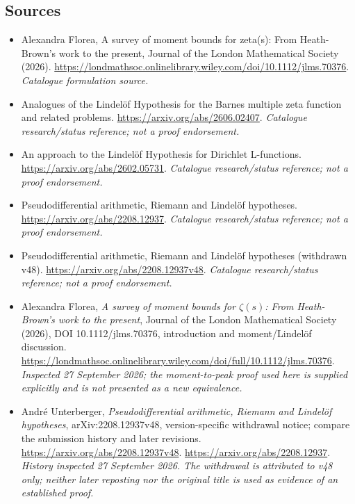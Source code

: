 \documentclass[11pt,a4paper]{article}
\numberwithin{equation}{section}
\begin{document}
\subsection{Sources}
\begin{itemize}\raggedright
\item[\textnormal{[S1]}]\hypertarget{source:81:1}{} Alexandra Florea, A survey of moment bounds for zeta(s): From Heath-Brown's work to the present, Journal of the London Mathematical Society (2026).
\url{https://londmathsoc.onlinelibrary.wiley.com/doi/10.1112/jlms.70376}.
{\small\textit{Catalogue formulation source.}}
\item[\textnormal{[S2]}]\hypertarget{source:81:2}{} Analogues of the Lindelöf Hypothesis for the Barnes multiple zeta function and related problems.
\url{https://arxiv.org/abs/2606.02407}.
{\small\textit{Catalogue research/status reference; not a proof endorsement.}}
\item[\textnormal{[S3]}]\hypertarget{source:81:3}{} An approach to the Lindelöf Hypothesis for Dirichlet L-functions.
\url{https://arxiv.org/abs/2602.05731}.
{\small\textit{Catalogue research/status reference; not a proof endorsement.}}
\item[\textnormal{[S4]}]\hypertarget{source:81:4}{} Pseudodifferential arithmetic, Riemann and Lindelöf hypotheses.
\url{https://arxiv.org/abs/2208.12937}.
{\small\textit{Catalogue research/status reference; not a proof endorsement.}}
\item[\textnormal{[S5]}]\hypertarget{source:81:5}{} Pseudodifferential arithmetic, Riemann and Lindelöf hypotheses (withdrawn v48).
\url{https://arxiv.org/abs/2208.12937v48}.
{\small\textit{Catalogue research/status reference; not a proof endorsement.}}
\item[\textnormal{[E1]}]\hypertarget{extra:81:1}{} Alexandra Florea,
\emph{A survey of moment bounds for $\zeta(s)$: From Heath-Brown's work to
the present}, Journal of the London Mathematical Society (2026),
DOI 10.1112/jlms.70376, introduction and moment/Lindel\"of discussion.
\url{https://londmathsoc.onlinelibrary.wiley.com/doi/full/10.1112/jlms.70376}.
{\small\textit{Inspected 27 September 2026; the moment-to-peak proof used
here is supplied explicitly and is not presented as a new equivalence.}}
\item[\textnormal{[E2]}]\hypertarget{extra:81:2}{} Andr\'e Unterberger,
\emph{Pseudodifferential arithmetic, Riemann and Lindel\"of hypotheses},
arXiv:2208.12937v48, version-specific withdrawal notice; compare the
submission history and later revisions.
\url{https://arxiv.org/abs/2208.12937v48}.
\url{https://arxiv.org/abs/2208.12937}.
{\small\textit{History inspected 27 September 2026. The withdrawal is
attributed to v48 only; neither later reposting nor the original title is
used as evidence of an established proof.}}
\end{itemize}
\end{document}
